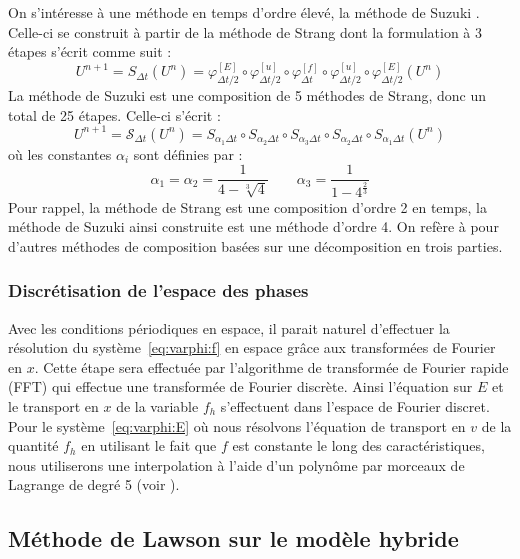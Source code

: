 On s'intéresse à une méthode en temps d'ordre élevé, la méthode de Suzuki \cite{Suzuki:1990}. Celle-ci se construit à partir de la méthode de Strang \cite{Strang:1968} dont la formulation à 3 étapes s'écrit comme suit :
\begin{equation}
  U^{n+1} = S_{\Delta t}(U^n) = \varphi^{[E]}_{\Delta t/2} \circ \varphi^{[u]}_{\Delta t/2} \circ \varphi^{[f]}_{\Delta t} \circ \varphi^{[u]}_{\Delta t/2} \circ \varphi^{[E]}_{\Delta t/2} (U^n) 
  \label{eq:strang}
\end{equation}
La méthode de Suzuki est une composition de 5 méthodes de Strang, donc un total de 25 étapes. Celle-ci s'écrit :
\begin{equation}
  U^{n+1} = \mathcal{S}_{\Delta t}(U^n) = S_{\alpha_1\Delta t} \circ S_{\alpha_2\Delta t} \circ S_{\alpha_3\Delta t} \circ S_{\alpha_2\Delta t} \circ S_{\alpha_1\Delta t} (U^n)
  \label{eq:suzuki}
\end{equation}
où les constantes $\alpha_i$ sont définies par :
$$
  \alpha_1 = \alpha_2 = \frac{1}{4 - \sqrt[3]{4}} \qquad \alpha_3 = \frac{1}{1- 4^{\frac{2}{3}}}
$$
Pour rappel, la méthode de Strang est une composition d'ordre 2 en temps, la méthode de Suzuki ainsi construite est une méthode d'ordre 4. 
On refère à \cite{Casas:2020} pour d'autres méthodes de composition basées sur une décomposition en trois parties. 

\subsubsection{Discrétisation de l'espace des phases}

Avec les conditions périodiques en espace, il parait naturel d'effectuer la résolution du système~\eqref{eq:varphi:f} en espace grâce aux transformées de Fourier en $x$. Cette étape sera effectuée par l'algorithme de transformée de Fourier rapide (FFT) qui effectue une transformée de Fourier discrète. Ainsi l'équation sur $E$ et le transport en $x$ de la variable $f_h$ s'effectuent dans l'espace de Fourier discret. Pour le système~\eqref{eq:varphi:E} où nous résolvons l'équation de transport en $v$ de la quantité $f_h$ en utilisant le fait que $f$ est constante le long des  caractéristiques, nous utiliserons une interpolation à l'aide d'un polynôme par morceaux de Lagrange de degré 5 (voir \cite{Charles:2013}). 



\subsection{Méthode de Lawson sur le modèle hybride}\label{ssec:lawson}

